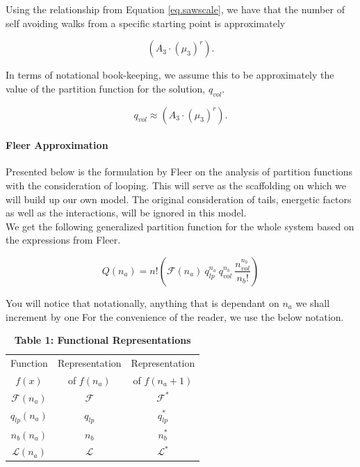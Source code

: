 \documentclass[12pt,letterpaper]{article}
\newcommand{\leng}{\mathcal{L}}
\newcommand{\fop}{\ensuremath{\mathcal{F}}}
\begin{document}
Using the relationship from Equation \ref{eq.sawscale}, we have that the number of self avoiding walks from a specific starting point is approximately 

\begin{equation}
	    \left(A_3\cdot (\mu_{3})^{r}\right).
	\label{eq. SAW}
\end{equation}

In terms of notational book-keeping, we assume this to be approximately the value of the partition function for the solution, $q_{vol}$.

\begin{equation}
	    q_{vol}\approx \left(A_3\cdot (\mu_{3})^{r}\right).
	\label{eq. q3}
\end{equation}


\paragraph{Fleer Approximation} Presented below is the formulation by Fleer \cite{fleer1993polymers} on the analysis of partition functions with the consideration of looping. This will serve as the scaffolding on which we will build up our own model. The original consideration of tails, energetic factors as well as the interactions, will be ignored in this model.\\

We get the following generalized partition function for the whole system based on the expressions from Fleer\cite{fleer1993polymers}.

\begin{equation}
	Q(n_a)
	=
	n!
	\left(
	    \fop(n_a)
	    ~
	    q_{lp}^{n_a}
	    ~
		q_{vol}^{n_{b}}
		~
		\frac{
			n_{vol}^{n_{b}}
		}{
			n_b!
		}
	\right)
	\label{Qfleer1}
\end{equation}


You will notice that notationally, anything that is dependant on $n_a$ we shall increment by one 
For the convenience of the reader, we use the below notation.

\begin{table}[H]
\begin{center}
\begin{tabular}{|c|c|c|}
    \hline
    Function  & Representation & Representation\\ $f(x)$ & of $f(n_a)$ & of $f(n_a+1)$  \\
    \hline\hline
    $\fop(n_a)$ & $\fop$  &  $\fop^{*}$\\  
    \hline
    $q_{lp}(n_a)$ & $q_{lp}$  & $q_{lp}^{*}$\\
    \hline    
    $n_b(n_a)$ & $n_b$ & $n_b^{*}$\\
    \hline
    $\leng(n_a)$ & $\leng$ & $\leng^{*}$\\
    \hline
\end{tabular}
\end{center}
\caption*{\textbf{Table 1: Functional Representations}}
\end{table}
\end{document}
